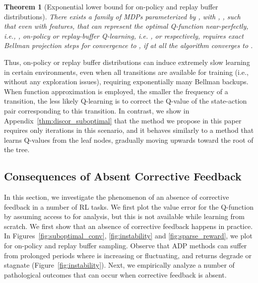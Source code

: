 \documentclass[jmlr]{article}
\newtheorem{theorem}{Theorem}[section]
\begin{document}
\begin{theorem}[Exponential lower bound for on-policy and replay buffer distributions]
\label{thm:exponential}
There exists a family of MDPs parameterized by , with , , such that even with features,  that can represent the optimal Q-function near-perfectly, i.e., , 
on-policy or replay-buffer Q-learning, i.e. , or  respectively, requires  \textit{exact} Bellman projection steps for convergence to , if at all the algorithm converges to .  
\end{theorem}
Thus, on-policy or replay buffer distributions can induce extremely slow learning in certain environments, even when all transitions are available for training (i.e., without any exploration issues), requiring exponentially many Bellman backups. When function approximation is employed, the smaller the frequency of a transition, the less likely Q-learning is to correct the Q-value of the state-action pair corresponding to this transition. In contrast, we show in Appendix~\ref{thm:discor_suboptimal} that the method we propose in this paper requires only  iterations in this scenario, and it behaves similarly to a method that learns Q-values from the leaf nodes, gradually moving upwards toward the root of the tree. 







\subsection{Consequences of Absent Corrective Feedback}
\label{sec:consequences}
{In this section, we investigate the phenomenon of an absence of corrective feedback in a number of RL tasks.} We first plot the value error  for the Q-function by assuming access to  for analysis, but this is not available while learning from scratch. We first show that an absence of corrective feedback happens in practice. In Figures~\ref{fig:suboptimal_conv}, \ref{fig:instability} and \ref{fig:sparse_reward}, we plot  for on-policy and replay buffer sampling. 
Observe that ADP methods can suffer from prolonged periods where  is increasing or fluctuating, and returns degrade or stagnate (Figure~\ref{fig:instability}).
Next, we empirically analyze a number of pathological outcomes that can occur when corrective feedback is absent.
\end{document}
